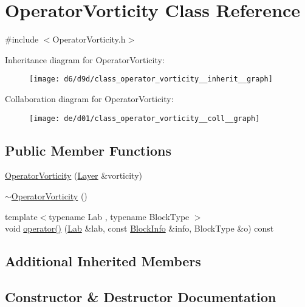 \hypertarget{class_operator_vorticity}{}\section{Operator\+Vorticity Class Reference}
\label{class_operator_vorticity}


{\ttfamily \#include $<$Operator\+Vorticity.\+h$>$}



Inheritance diagram for Operator\+Vorticity\+:\nopagebreak
\begin{figure}[H]
\begin{center}
\leavevmode
\texttt{[image: d6/d9d/class\_operator\_vorticity\_\_inherit\_\_graph]}
\end{center}
\end{figure}


Collaboration diagram for Operator\+Vorticity\+:\nopagebreak
\begin{figure}[H]
\begin{center}
\leavevmode
\texttt{[image: de/d01/class\_operator\_vorticity\_\_coll\_\_graph]}
\end{center}
\end{figure}
\subsection*{Public Member Functions}
\begin{DoxyCompactItemize}
\item 
\hyperlink{class_operator_vorticity_a5f119e3cd343868bce48c0c46865854c}{Operator\+Vorticity} (\hyperlink{struct_layer}{Layer} \&vorticity)
\item 
\hyperlink{class_operator_vorticity_af42ecc8472869fd7ae95d1506f29f39d}{$\sim$\+Operator\+Vorticity} ()
\item 
{\footnotesize template$<$typename Lab , typename Block\+Type $>$ }\\void \hyperlink{class_operator_vorticity_a3e677de987ab03e9a31a6978fd46b512}{operator()} (\hyperlink{_definitions_8h_ae720d9054713370bbf4c86860e4dde70}{Lab} \&lab, const \hyperlink{struct_block_info}{Block\+Info} \&info, Block\+Type \&o) const 
\end{DoxyCompactItemize}
\subsection*{Additional Inherited Members}


\subsection{Constructor \& Destructor Documentation}
\hypertarget{class_operator_vorticity_a5f119e3cd343868bce48c0c46865854c}{}
